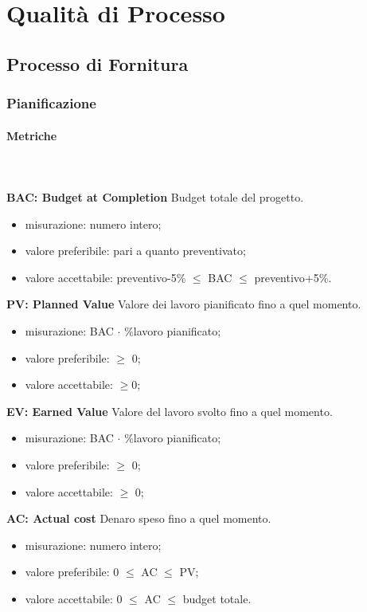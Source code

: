 \section{Qualità di Processo}
	\subsection{Processo di Fornitura}
		\subsubsection{Pianificazione}
			\paragraph{Metriche} \mbox{} \\ \\
				\textbf{BAC: Budget at Completion} Budget totale del progetto\glo.
				\begin{itemize}
					\item misurazione: numero intero;
					\item valore preferibile: pari a quanto preventivato;
					\item valore accettabile: preventivo-5\% $\le$ BAC $\le$ preventivo+5\%.
				\end{itemize}
				\textbf{PV: Planned Value} Valore dei lavoro pianificato fino a quel momento.
				\begin{itemize}
					\item misurazione: BAC $\cdot$ \%lavoro pianificato;
					\item valore preferibile: $\ge$ 0;
					\item valore accettabile: $\ge$0;
				\end{itemize}
				\textbf{EV: Earned Value} Valore del lavoro svolto fino a quel momento.
				\begin{itemize}
					\item misurazione: BAC $\cdot$ \%lavoro pianificato;
					\item valore preferibile: $\ge$ 0;
					\item valore accettabile: $\ge$ 0;
				\end{itemize}
				\textbf{AC: Actual cost} Denaro speso fino a quel momento.
				\begin{itemize}
					\item misurazione: numero intero;
					\item valore preferibile: 0 $\le$ AC $\le$ PV;
					\item valore accettabile: 0 $\le$ AC $\le$ budget totale.
				\end{itemize}
